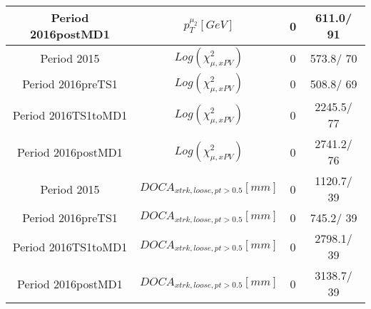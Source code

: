 \documentclass{article}
\begin{document}
\begin{longtable}{c|c|c|c}
\hline
 Period 2016postMD1 & $p_{T}^{\mu_{2}} [GeV]$ & 0 & 611.0/ 91\\
\hline
 Period 2015 & $Log(\chi^{2}_{\mu,xPV})$ & 0 & 573.8/ 70\\
\hline
 Period 2016preTS1 & $Log(\chi^{2}_{\mu,xPV})$ & 0 & 508.8/ 69\\
\hline
 Period 2016TS1toMD1 & $Log(\chi^{2}_{\mu,xPV})$ & 0 & 2245.5/ 77\\
\hline
 Period 2016postMD1 & $Log(\chi^{2}_{\mu,xPV})$ & 0 & 2741.2/ 76\\
\hline
 Period 2015 & $DOCA_{xtrk, loose, pt>0.5} [mm]$ & 0 & 1120.7/ 39\\
\hline
 Period 2016preTS1 & $DOCA_{xtrk, loose, pt>0.5} [mm]$ & 0 & 745.2/ 39\\
\hline
 Period 2016TS1toMD1 & $DOCA_{xtrk, loose, pt>0.5} [mm]$ & 0 & 2798.1/ 39\\
\hline
 Period 2016postMD1 & $DOCA_{xtrk, loose, pt>0.5} [mm]$ & 0 & 3138.7/ 39\\
\hline
\end{longtable}
\end{document}
